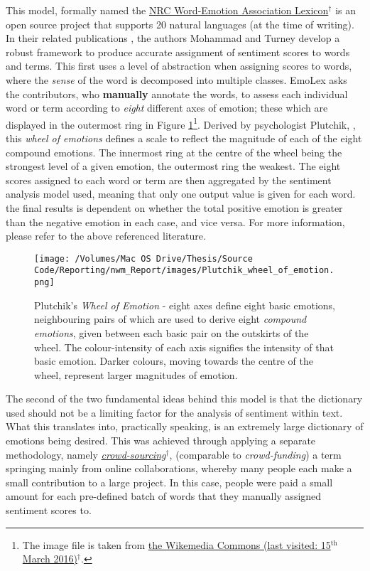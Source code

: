 \documentclass{article}
\begin{document}
This model, formally named the \href{http://saifmohammad.com/WebPages/NRC-Emotion-Lexicon.htm}{NRC Word-Emotion Association Lexicon$^{\dag{}}$} is an open source project that supports 20 natural languages (at the time of writing). In their related publications \cite{Mohammad13}, the authors Mohammad and Turney develop a robust framework to produce accurate assignment of sentiment scores to words and terms. This first uses a level of abstraction when assigning scores to words, where the \emph{sense} of the word is decomposed into multiple classes. EmoLex asks the contributors, who \textbf{manually} annotate the words, to assess each individual word or term according to \emph{eight} different axes of emotion; these which are displayed in the outermost ring in Figure \ref{fig:wheel-of-emotion}\footnote{The image file is taken from \href{https://en.wikipedia.org/wiki/Contrasting_and_categorization_of_emotions#Plutchik.27s_wheel_of_emotions}{ the Wikemedia Commons (last visited: 15$^{\text{th}}$ March 2016)$^{\dag{}}$}.}. Derived by psychologist Plutchik, \cite{plutchik1980general}, this \emph{wheel of emotions} defines a scale to reflect the magnitude of each of the eight compound emotions. The innermost ring at the centre of the wheel being the strongest level of a given emotion, the outermost ring the weakest.
The eight scores assigned to each word or term are then aggregated by the sentiment analysis model used, meaning that only one output value is given for each word. the final results is dependent on whether the total positive emotion is greater than the negative emotion in each case, and vice versa. For more information, please refer to the above referenced literature.

\begin{figure}[htb]
\centering
\texttt{[image: /Volumes/Mac OS Drive/Thesis/Source Code/Reporting/nwm\_Report/images/Plutchik\_wheel\_of\_emotion.png]}
\caption[Plutchik's \emph{Wheel of Emotion}]{\label{fig:wheel-of-emotion}Plutchik's \emph{Wheel of Emotion} - eight axes define eight basic emotions, neighbouring pairs of which are used to derive eight \emph{compound emotions}, given between each basic pair on the outskirts of the wheel. The colour-intensity of each axis signifies the intensity of that basic emotion. Darker colours, moving towards the centre of the wheel, represent larger magnitudes of emotion.}
\end{figure}

The second of the two fundamental ideas behind this model is that the dictionary used should not be a limiting factor for the analysis of sentiment within text. What this translates into, practically speaking, is an extremely large dictionary of emotions being desired. This was achieved through applying a separate methodology, namely \href{https://en.wikipedia.org/wiki/Crowdsourcing}{\emph{crowd-sourcing$^{\dag{}}$}}, (comparable to \emph{crowd-funding}) a term springing mainly from online collaborations, whereby many people each make a small contribution to a large project. In this case, people were paid a small amount for each pre-defined batch of words that they manually assigned sentiment scores to.
\end{document}
